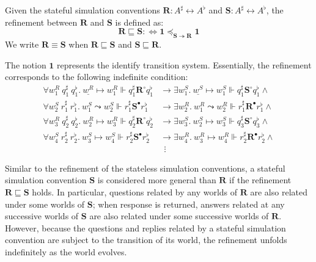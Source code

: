 \documentclass[acmsmall,screen,review,anonymous]{acmart}
\newcommand{\que}{\circ}
\newcommand{\ans}{\bullet}
\renewcommand{\preceq}{\preccurlyeq}
\newcommand{\intl}[1]{\underline{#1}}
\begin{document}
\begin{definition}  \label{def:scref}
  Given the stateful simulation conventions
  $\mathbf{R} : A^\sharp \leftrightarrow A^\flat$ and
  $\mathbf{S} : A^\sharp \leftrightarrow A^\flat$,
  the refinement between $\mathbf{R}$ and $\mathbf{S}$ is defined as:
  \[
    \mathbf{R} \sqsubseteq \mathbf{S} :\Leftrightarrow
    \mathbf{1} \preceq_{\mathbf{S} \twoheadrightarrow \mathbf{R}} \mathbf{1}
  \]
We write $\mathbf{R} \equiv \mathbf{S}$ when
$\mathbf{R} \sqsubseteq \mathbf{S}$ and
$\mathbf{S} \sqsubseteq \mathbf{R}$.
\end{definition}

The notion $\mathbf{1}$ represents the identify transition system.
Essentially, the refinement corresponds to the following indefinite condition:
\begin{align*}
  \forall w^R_1\ q^\sharp_1\ q^\flat_1.\ \intl{w^R} \mapsto w^R_1
  \Vdash q^\sharp_1 \mathrel{\mathbf{R}^\que} q^\flat_1 &\rightarrow
  \exists w^S_1.\ \intl{w^S} \mapsto w^S_1 
  \Vdash q^\sharp_1 \mathrel{\mathbf{S}^\que} q^\flat_1 \wedge\\
  \forall w^S_2\ r^\sharp_1\ r^\flat_1.\ w^S_1 \leadsto w^S_2
  \Vdash r^\sharp_1 \mathrel{\mathbf{S}^\ans} r^\flat_1 &\rightarrow
  \exists w^R_2.\ w^R_1 \leadsto w^R_2
  \Vdash r^\sharp_1 \mathrel{\mathbf{R}^\ans} r^\flat_1 \wedge\\
  \forall w^R_3\ q^\sharp_2\ q^\flat_2.\ w^R_2 \mapsto w^R_3
  \Vdash q^\sharp_2 \mathrel{\mathbf{R}^\que} q^\flat_2 &\rightarrow
  \exists w^S_3.\ w^S_2 \mapsto w^S_3
  \Vdash q^\sharp_3 \mathrel{\mathbf{S}^\que} q^\flat_3 \wedge\\
  \forall w^S_4\ r^\sharp_2\ r^\flat_2.\ w^S_3 \mapsto w^S_4
  \Vdash r^\sharp_2 \mathrel{\mathbf{S}^\ans} r^\flat_2 &\rightarrow
  \exists w^R_4.\ w^R_3 \mapsto w^R_4
  \Vdash r^\sharp_2 \mathrel{\mathbf{R}^\ans} r^\flat_2 \wedge\\[-1ex]
  &\:\:\vdots
\end{align*}

Similar to the refinement of the stateless simulation conventions,
a stateful simulation convention $\mathbf{S}$
is considered more general than $\mathbf{R}$
if the refinement $\mathbf{R} \sqsubseteq \mathbf{S}$ holds.
In particular, questions related by any worlds of $\mathbf{R}$
are also related under some worlds of $\mathbf{S}$;
when response is returned,
answers related at any successive worlds of $\mathbf{S}$
are also related under some successive worlds of $\mathbf{R}$.
However, because the questions and replies related
by a stateful simulation convention
are subject to the transition of its world,
the refinement unfolds indefinitely as the world evolves.
\end{document}
